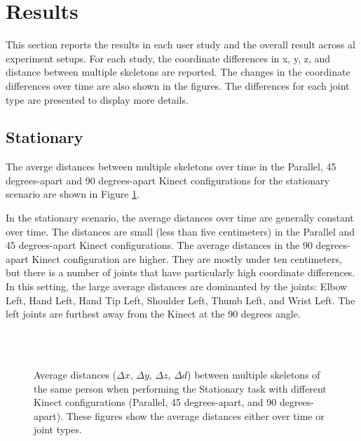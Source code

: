 \documentclass{sigchi}
\begin{document}
\section{Results}
\label{sec:evaluation}

This section reports the results in each user study and the overall result across al experiment setups. For each study, the coordinate differences in x, y, z, and distance between multiple skeletons are reported. The changes in the coordinate differences over time are also shown in the figures. The differences for each joint type are presented to display more details.

\subsection{Stationary}

The averge distances between multiple skeletons over time in the Parallel, 45 degrees-apart and 90 degrees-apart Kinect configurations for the stationary scenario are shown in Figure \ref{fig:results_stationary}.

In the stationary scenario, the average distances over time are generally constant over time. The distances are small (less than five centimeters) in the Parallel and 45 degrees-apart Kinect configurations. The average distances in the 90 degrees-apart Kinect configuration are higher. They are mostly under ten centimeters, but there is a number of joints that have particularly high coordinate differences. In this setting, the large average distances are dominanted by the joints: Elbow Left, Hand Left, Hand Tip Left, Shoulder Left, Thumb Left, and Wrist Left. The left joints are furthest away from the Kinect at the 90 degrees angle.

\begin{figure}
  \centering

  
   \\
  
   \\
  
  

  \caption{Average distances ($\Delta x$, $\Delta y$, $\Delta z$, $\Delta d$) between multiple skeletons
    of the same person when performing the Stationary task with different Kinect configurations
    (Parallel, 45 degrees-apart, and 90 degrees-apart). These figures show the average distances either
    over time or joint types.}

  \label{fig:results_stationary}
\end{figure}
\end{document}
